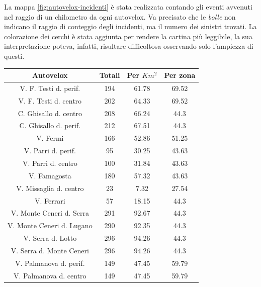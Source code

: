 \documentclass[a4paper,12pt]{report}
\newcommand{\quotestyle}[1]{\textit{#1}}
\begin{document}
La mappa \ref{fig:autovelox-incidenti} è stata realizzata contando 
gli eventi avvenuti nel raggio di un chilometro da ogni autovelox. 
Va precisato che le \quotestyle{bolle} non indicano il raggio di conteggio degli incidenti, ma 
il numero dei sinistri trovati. 
La colorazione dei cerchi è stata aggiunta per 
rendere la cartina più leggibile, la sua interpretazione poteva, infatti, risultare 
difficoltosa osservando solo l'ampiezza di questi. 

\begin{center}
    \def\arraystretch{1.5}%
    \begin{tabular}{ |c|c|c|c| }
        \hline
        Autovelox & Totali & Per $Km^2$ & Per zona \\ 
        \hline
        \rowcolor{TableGray}
        V. F. Testi d. perif.\footnotemark[1]   &   194 &   61.78   &   69.52 \\
        V. F. Testi d. centro                   &   202 &   64.33   &   69.52 \\
        \rowcolor{TableGray}
        C. Ghisallo d. centro\footnotemark[2]   &   208 &   66.24   &   44.3 \\
        C. Ghisallo d. perif.                   &   212 &   67.51   &   44.3 \\
        \rowcolor{TableGray}
        V. Fermi                                &   166 &   52.86   &   51.25 \\
        V. Parri d. perif.                      &    95 &   30.25   &   43.63 \\
        \rowcolor{TableGray}
        V. Parri d. centro                      &   100 &   31.84   &   43.63 \\
        V. Famagosta                            &   180 &   57.32   &   43.63 \\
        \rowcolor{TableGray}
        V. Missaglia d. centro                  &   23  &    7.32   &   27.54 \\
        V. Ferrari                              &   57  &   18.15   &   44.3 \\
        \rowcolor{TableGray}
        V. Monte Ceneri d. Serra                &   291 &   92.67   &   44.3 \\
        V. Monte Ceneri d. Lugano               &   290 &   92.35   &   44.3 \\
        \rowcolor{TableGray}
        V. Serra d. Lotto                       &   296 &   94.26   &   44.3 \\
        V. Serra d. Monte Ceneri                &   296 &   94.26   &   44.3 \\
        \rowcolor{TableGray}
        V. Palmanova d. perif.                  &   149 &   47.45   &   59.79 \\
        V. Palmanova d. centro                  &   149 &   47.45   &   59.79 \\
        \hline
    \end{tabular}
\end{center}
\end{document}
